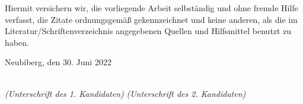\newpage

\thispagestyle{empty}

\begin{large}

\vspace*{2cm}

\noindent
Hiermit versichern wir, die vorliegende Arbeit selbständig und ohne fremde Hilfe verfasst, die Zitate ordnungsgemäß gekennzeichnet und keine anderen, als die im Literatur/Schriftenverzeichnis angegebenen Quellen und Hilfsmittel benutzt zu haben.\\[1em]

\noindent


\vspace{2cm}

\noindent
Neubiberg, den 30. Juni 2022

\vspace{3cm}

\dotfill
\hspace*{3cm}%
\dotfill \\
\hspace*{0.3cm}
\textit{(Unterschrift des 1. Kandidaten)}
\hspace*{3.2cm}%
\textit{(Unterschrift des 2. Kandidaten)}

\end{large}

